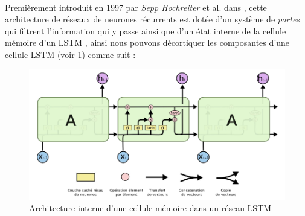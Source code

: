 		\paragraph{}
		Premièrement introduit en 1997 par \textit{	Sepp Hochreiter } et al. dans \cite{lstm_original_paper}, cette architecture de réseaux de neurones récurrents est dotée d'un système de \textit{portes} qui filtrent l'information qui y passe ainsi que d'un état interne de la cellule mémoire d'un LSTM , ainsi nous pouvons décortiquer les composantes d'une cellule LSTM (voir \ref{lstm_architecture}) comme suit : 
		\begin{figure}[H]
			\centering
			\includegraphics[width=0.55\linewidth]{images/notions/lstm_arch.png}
			\caption{Architecture interne d'une cellule mémoire dans un réseau LSTM \cite{rnns_online}}
			\label{lstm_architecture}
		\end{figure}
